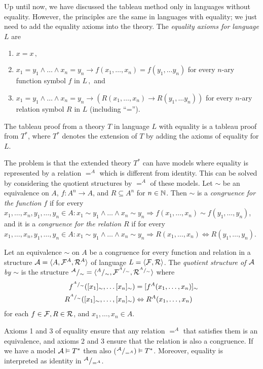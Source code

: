 Up until now, we have discussed the tableau method only in languages without equality. However, the principles are the same in languages with equality; we just need to add the equality axioms into the theory. The \emph{equality axioms for language $L$} are 
\begin{enumerate}
	\item $x=x\,,$
	\item $x_1 = y_1 \land \dots \land x_n=y_n \to f(x_1, \dots, x_n) = f(y_1, \dots y_n)$ for every $n$-ary function symbol $f$ in $L\,,$ and
	\item $x_1 = y_1 \land \dots \land x_n=y_n \to (R(x_1, \dots, x_n) \to R(y_1, \dots y_n))$ for every $n$-ary relation symbol $R$ in $L$ (including ``='').
\end{enumerate}
The tableau proof from a theory $T$ in language $L$ with equality is a tableau proof from $T^*$, where $T^*$ denotes the extension of $T$ by adding the axioms of equality for $L$.

The problem is that the extended theory $T^*$ can have models where equality is represented by a relation $=^A$ which is different from identity. This can be solved by considering the quotient structures by $=^A$ of these models. Let $\sim$ be an equivalence on $A$, $f: A^n \to A$, and $R\subseteq A^n$ for $n \in \mathbb{N}$. Then $\sim$ is a \emph{congruence for the function $f$} if for every $x_1, \dots, x_n, y_1, \dots, y_n \in A: x_1 \sim y_1 \land \dots \land x_n \sim y_n \Rightarrow f(x_1, \dots, x_n) \sim f(y_1, \dots, y_n)$, and it is a \emph{congruence for the relation $R$} if for every $x_1, \dots, x_n, y_1, \dots, y_n \in A: x_1 \sim y_1 \land \dots \land x_n \sim y_n \Rightarrow R(x_1, \dots, x_n) \Leftrightarrow R(y_1, \dots, y_n)$. 

Let an equivalence $\sim$ on $A$ be a congruence for every function and relation in a structure $\mathcal{A} = \langle A, \mathcal{F}^A, \mathcal{R}^A \rangle$ of language $L = \langle \mathcal{F}, \mathcal{R} \rangle$. The \emph{quotient structure of $\mathcal{A}$ by $\sim$} is the structure $^{\mathcal{A}}/_{\sim} = \langle ^{A}/_{\sim}, \mathcal{F}^{^{A}/_{\sim}}, \mathcal{R}^{^{A}/_{\sim}} \rangle$ where
\begin{align*}
f^{^{A}/_{\sim}}([x_1]_\sim, \dots [x_n]_\sim)&=[f^A(x_1, \dots, x_n)]_\sim \\
R^{^{A}/_{\sim}}([x_1]_\sim, \dots, [x_n]_\sim) &\Leftrightarrow R^A(x_1, \dots, x_n)
\end{align*}
for each $f \in \mathcal{F}, R \in \mathcal{R}$, and $x_1, \dots, x_n \in A$. 

Axioms 1 and 3 of equality ensure that any relation $=^A$ that satisfies them is an equivalence, and axioms 2 and 3 ensure that the relation is also a congruence. If we have a model $\mathcal{A} \vDash T^*$ then also ($^{\mathcal{A}}/_{=^A}) \vDash T^*$. Moreover, equality is interpreted as identity in $^{\mathcal{A}}/_{=^A}$.


